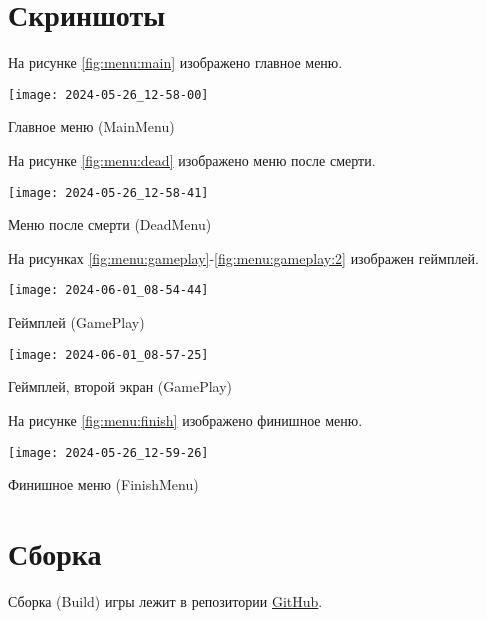 \section{Скриншоты}

На рисунке \ref{fig:menu:main} изображено главное меню.
\begin{image}
	\texttt{[image: 2024-05-26\_12-58-00]}
	\caption{Главное меню (MainMenu)}
	\label{fig:menu:main}
\end{image}

На рисунке \ref{fig:menu:dead} изображено меню после смерти.

\begin{image}
	\texttt{[image: 2024-05-26\_12-58-41]}
	\caption{Меню после смерти (DeadMenu)}
	\label{fig:menu:dead}
\end{image}

На рисунках \ref{fig:menu:gameplay}-\ref{fig:menu:gameplay:2}
изображен геймплей.

\begin{image}
	\texttt{[image: 2024-06-01\_08-54-44]}
	\caption{Геймплей (GamePlay)}
	\label{fig:menu:gameplay}
\end{image}

\begin{image}
	\texttt{[image: 2024-06-01\_08-57-25]}
	\caption{Геймплей, второй экран (GamePlay)}
	\label{fig:menu:gameplay:2}
\end{image}

На рисунке \ref{fig:menu:finish} изображено финишное меню.

\begin{image}
	\texttt{[image: 2024-05-26\_12-59-26]}
	\caption{Финишное меню (FinishMenu)}
	\label{fig:menu:finish}
\end{image}

\section{Сборка}

Сборка (Build) игры лежит в репозитории
\href{https://github.com/AndB0ndar/UnityGame}{GitHub}.

